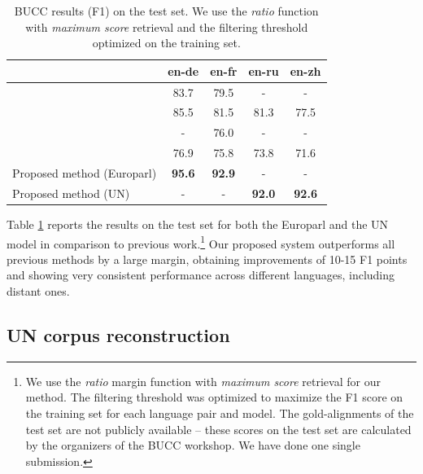 \documentclass[11pt,a4paper]{article}
\begin{document}
\begin{table}[t]
\begin{small}
\begin{center}
  \addtolength{\tabcolsep}{-3pt}
  \begin{tabular}{lcccc}
    \toprule
    & \multicolumn{1}{c}{\bf en-de} & \multicolumn{1}{c}{\bf en-fr} & \multicolumn{1}{c}{\bf en-ru} & \multicolumn{1}{c}{\bf en-zh} \\
    \midrule
    \citet{azpeitia2017weighted} & 83.7 & 79.5 & - & - \\
    \citet{azpeitia2018extracting} & 85.5 & 81.5 & 81.3 & 77.5 \\
    \citet{bouamor2018h2} & - & 76.0 & - & - \\
    \citet{schwenk2018filtering} & 76.9 & 75.8 & 73.8 & 71.6 \\
    \midrule
    Proposed method (Europarl) & \bf 95.6 & \bf 92.9 & - & - \\
    Proposed method (UN) & - & - & \bf 92.0 & \bf 92.6 \\
    \bottomrule
  \end{tabular}
\end{center}
\end{small}
\caption{BUCC results (F1) on the test set. We use the \textit{ratio} function with \textit{maximum score} retrieval and the filtering threshold optimized on the training set.}
\label{tab:results_bucc}
\end{table}



Table \ref{tab:results_bucc} reports the results on the test set for both the Europarl and the UN model in comparison to previous work.\footnote{We use the \textit{ratio} margin function with \textit{maximum score} retrieval for our method. The filtering threshold was optimized to maximize the F1 score on the training set for each language pair and model. The gold-alignments of the test set are not publicly available -- these scores on the test set are calculated by the organizers of the BUCC workshop. We have done one single submission.} Our proposed system outperforms all previous methods by a large margin, obtaining improvements of 10-15 F1 points and showing very consistent performance across different languages, including distant ones.


\subsection{UN corpus reconstruction} \label{subsec:un}
\end{document}
